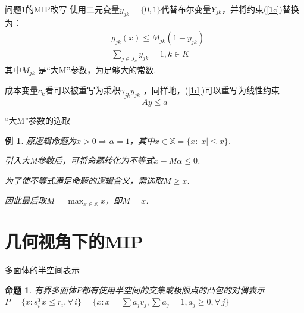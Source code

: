 \documentclass[notheorems,11pt]{beamer}
\theoremstyle{plain}
\numberwithin{theorem}{section}
\numberwithin{lemma}{section}
\newtheorem{proposition}{命题}
\numberwithin{corollary}{section}
\theoremstyle{example}
\newtheorem{example}{例}
\begin{document}
\begin{frame}{问题1的MIP改写}
使用二元变量$y_{jk}=\{0,1\}$代替布尔变量$Y_{jk}$，并将约束(\ref{1c})替换为：
\begin{subequations}
\begin{align}
  &g_{jk}(x)\leqslant M_{jk}(1-y_{jk}) \\
  &\sum_{j\in J_k}{y_{jk}}=1,k\in K
\end{align}
\end{subequations}
其中$M_{jk}$ 是“大M”参数，为足够大的常数.\par
成本变量$c_k$看可以被重写为乘积$\gamma_{jk}y_{jk}$ ，同样地，(\ref{1d})可以重写为线性约束
$$Ay\leqslant a$$
\end{frame}

\begin{frame}{“大M”参数的选取}
  \begin{example}
    原逻辑命题为$x>0\Longrightarrow \alpha=1$，其中$x\in\mathbb{X}=\{x:|x|\leqslant \overline{x}\}$.\par
    引入大M参数后，可将命题转化为不等式$x-M\alpha\leqslant 0$.\par
    为了使不等式满足命题的逻辑含义，需选取$M\geqslant \overline{x}$.\par
    因此最后取$M=\max_{x\in\mathbb{X}}{x}$，即$M=\overline{x}$.
  \end{example}

\end{frame}


\section{几何视角下的MIP}

\begin{frame}{多面体的半空间表示}
  \begin{proposition}{}
    有界多面体$P$都有使用半空间的交集或极限点的凸包的对偶表示$P=\{x:s_i^Tx\leqslant r_i,\forall\, i\}=\{x:x=\sum{a_jv_j,\sum{a_j}=1,a_j\geqslant 0,\forall\, j}\}$
  \end{proposition}
\end{frame}
\end{document}
